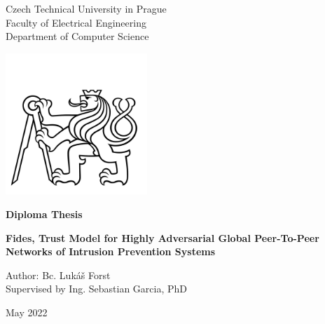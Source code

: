 

\begin{titlepage}
    \begin{center}
        
        \LARGE
        Czech Technical University in Prague\\
        Faculty of Electrical Engineering\\
        Department of Computer Science
        
        \includegraphics[width=0.4\textwidth]{assets/ctu_blackwhite.jpg}

        \Large
        \textbf{Diploma Thesis}
        
        \vfill
        
        \vspace*{0.5cm}
        \LARGE
        \textbf{Fides, Trust Model for Highly Adversarial Global Peer-To-Peer Networks of Intrusion Prevention Systems}
        

        \vfill

        \large
        Author: Bc. Lukáš Forst \\
        Supervised by Ing. Sebastian Garcia, PhD
        
        \vspace{0.8cm}

        \Large
        May 2022

    \end{center}
\end{titlepage}

\thispagestyle{empty}
\cleardoublepage